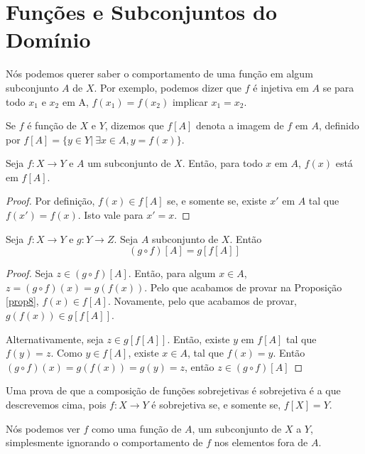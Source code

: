 \section{Funções e Subconjuntos do Domínio}

Nós podemos querer saber o comportamento de uma função em algum subconjunto
$A$ de  $X$. Por exemplo, podemos dizer que $f$ é injetiva em $A$ se para
todo $x_1$ e $x_2$ em A, $f(x_1) = f(x_2) $ implicar $x_1 = x_2 $.

\begin{definition}
    \label{def8}
    Se $f$ é função de $X$ e $Y$, dizemos que $f[A]$ denota a imagem de $f$ em
    $A$, definido por $f[A] = \{y \in Y | ~\exists x \in A, y = f(x)\}$.
\end{definition}

\begin{theorem}
    \label{prop7}
    Seja $f: X \to Y $ e $A$ um subconjunto de $X$. Então, para todo $x$ em
    $A$, $f(x)$ está em $f[A]$.
\end{theorem}

\begin{proof}
    Por definição, $f(x) \in f[A] $ se, e somente se, existe $x'$ em $A$ tal que
    $f(x') = f(x)$. Isto vale para  $x' = x $.
\end{proof}

\begin{theorem}
    \label{prop8}
    Seja $f: X \to Y$ e $g: Y \to Z$. Seja $A$ subconjunto de $X$. Então
    $$(g \circ f)[A] = g[f[A]]$$
\end{theorem}

\begin{proof}
    Seja $z \in (g \circ f)[A]$. Então, para algum $x \in A$, $z = (g \circ f)(x) = g(f(x))$.
    Pelo que acabamos de provar na Proposição \ref{prop8}, $f(x) \in f[A]$. Novamente, pelo
    que acabamos de provar, $g(f(x)) \in g[f[A]] $.

    Alternativamente, seja $z \in g[f[A]]$. Então, existe $y$ em $f[A]$ tal que
    $f(y) = z$. Como $y \in f[A]$, existe $x \in A$, tal que $f(x) = y$. Então
    $(g \circ f)(x) = g(f(x)) = g(y) = z$, então $z \in (g \circ f)[A] $
\end{proof}

Uma prova de que a composição de funções sobrejetivas é
sobrejetiva é a que descrevemos cima, pois $f: X \to Y$ é
sobrejetiva se, e somente se, $f[X] = Y$.

Nós podemos ver $f$ como uma função de $A$, um subconjunto de $X$ a $Y$, simplesmente
ignorando o comportamento de $f$ nos elementos fora de $A$.

